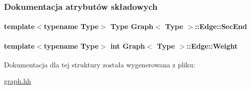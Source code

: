 \subsubsection{Dokumentacja atrybutów składowych}
\hypertarget{struct_graph_1_1_edge_a55de9e46eec7696bf5511c78866684f0}{
\paragraph[{Sec\-End}]{\setlength{\rightskip}{0pt plus 5cm}template$<$typename Type$>$ Type {\bf Graph}$<$ Type $>$\-::Edge\-::\-Sec\-End}}\label{struct_graph_1_1_edge_a55de9e46eec7696bf5511c78866684f0}
\hypertarget{struct_graph_1_1_edge_ae57c0ca00807c73a604bc562cf638600}{
\paragraph[{Weight}]{\setlength{\rightskip}{0pt plus 5cm}template$<$typename Type$>$ int {\bf Graph}$<$ Type $>$\-::Edge\-::\-Weight}}\label{struct_graph_1_1_edge_ae57c0ca00807c73a604bc562cf638600}


Dokumentacja dla tej struktury została wygenerowana z pliku\-:\begin{DoxyCompactItemize}
\item 
\hyperlink{graph_8hh}{graph.\-hh}\end{DoxyCompactItemize}
